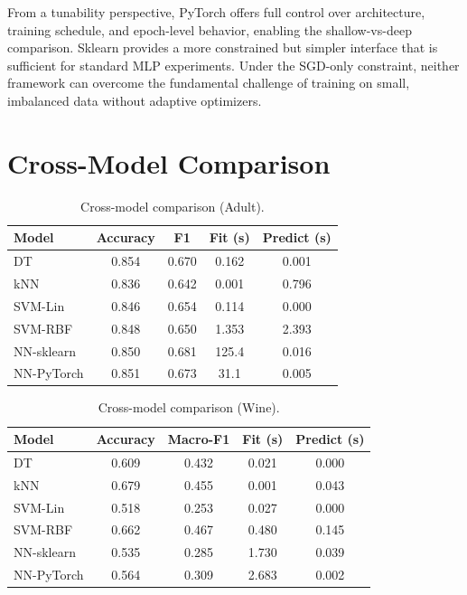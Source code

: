 \documentclass[10pt,twocolumn]{article}
\begin{document}
From a tunability perspective, PyTorch offers full control over architecture, training schedule, and epoch-level behavior, enabling the shallow-vs-deep comparison. Sklearn provides a more constrained but simpler interface that is sufficient for standard MLP experiments. Under the SGD-only constraint, neither framework can overcome the fundamental challenge of training on small, imbalanced data without adaptive optimizers.

\section{Cross-Model Comparison}

\begin{table}[H]
\centering
\caption{Cross-model comparison (Adult).}
\label{tab:adult_compare}
\small
\begin{tabular}{lcccc}
\toprule
Model & Accuracy & F1 & Fit (s) & Predict (s) \\
\midrule
DT       & 0.854 & 0.670 & 0.162 & 0.001 \\
kNN      & 0.836 & 0.642 & 0.001 & 0.796 \\
SVM-Lin  & 0.846 & 0.654 & 0.114 & 0.000 \\
SVM-RBF  & 0.848 & 0.650 & 1.353 & 2.393 \\
NN-sklearn & 0.850 & 0.681 & 125.4 & 0.016 \\
NN-PyTorch & 0.851 & 0.673 & 31.1  & 0.005 \\
\bottomrule
\end{tabular}
\end{table}

\begin{table}[H]
\centering
\caption{Cross-model comparison (Wine).}
\label{tab:wine_compare}
\small
\begin{tabular}{lcccc}
\toprule
Model & Accuracy & Macro-F1 & Fit (s) & Predict (s) \\
\midrule
DT       & 0.609 & 0.432 & 0.021 & 0.000 \\
kNN      & 0.679 & 0.455 & 0.001 & 0.043 \\
SVM-Lin  & 0.518 & 0.253 & 0.027 & 0.000 \\
SVM-RBF  & 0.662 & 0.467 & 0.480 & 0.145 \\
NN-sklearn & 0.535 & 0.285 & 1.730 & 0.039 \\
NN-PyTorch & 0.564 & 0.309 & 2.683 & 0.002 \\
\bottomrule
\end{tabular}
\end{table}
\end{document}
